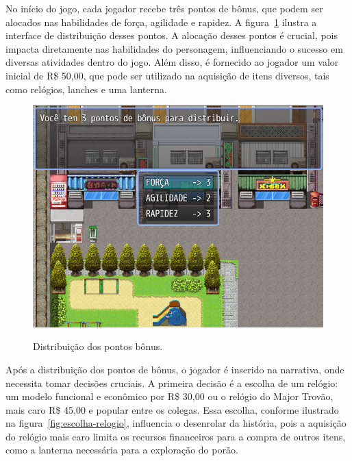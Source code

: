 No início do jogo, cada jogador recebe três pontos de bônus, que podem ser alocados nas habilidades de força, agilidade e rapidez. A figura~\ref{fig:distribui-bonus} ilustra a interface de distribuição desses pontos. A alocação desses pontos é crucial, pois impacta diretamente nas habilidades do personagem, influenciando o sucesso em diversas atividades dentro do jogo. Além disso, é fornecido ao jogador um valor inicial de R\$ 50,00, que pode ser utilizado na aquisição de itens diversos, tais como relógios, lanches e uma lanterna.

\begin{figure}[!htbp]
	\centering
	\caption{Distribuição dos pontos bônus.}
	\includegraphics[scale=0.55]{Textuais/Pictures/Distribui-bonus.png}
	\label{fig:distribui-bonus}
\end{figure}

\newpage

Após a distribuição dos pontos de bônus, o jogador é inserido na narrativa, onde necessita tomar decisões cruciais. A primeira decisão é a escolha de um relógio: um modelo funcional e econômico por R\$ 30,00 ou o relógio do Major Trovão, mais caro R\$ 45,00 e popular entre os colegas. Essa escolha, conforme ilustrado na figura~\ref{fig:escolha-relogio}, influencia o desenrolar da história, pois a aquisição do relógio mais caro limita os recursos financeiros para a compra de outros itens, como a lanterna necessária para a exploração do porão.

